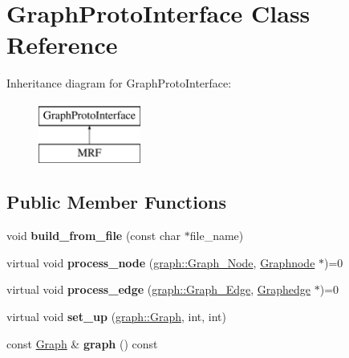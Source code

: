 \hypertarget{classGraphProtoInterface}{
\section{GraphProtoInterface Class Reference}
\label{classGraphProtoInterface}
}
Inheritance diagram for GraphProtoInterface:\begin{figure}[H]
\begin{center}
\leavevmode
\includegraphics[height=2cm]{classGraphProtoInterface}
\end{center}
\end{figure}
\subsection*{Public Member Functions}
\begin{DoxyCompactItemize}
\item 
\hypertarget{classGraphProtoInterface_a4845501ec86ea627ce484cd78162c84c}{
void {\bfseries build\_\-from\_\-file} (const char $\ast$file\_\-name)}
\label{classGraphProtoInterface_a4845501ec86ea627ce484cd78162c84c}

\item 
\hypertarget{classGraphProtoInterface_a0dbd0905dbab167b9293d0ef32409af3}{
virtual void {\bfseries process\_\-node} (\hyperlink{classgraph_1_1Graph__Node}{graph::Graph\_\-Node}, \hyperlink{classScarab_1_1Graph_1_1Graphnode}{Graphnode} $\ast$)=0}
\label{classGraphProtoInterface_a0dbd0905dbab167b9293d0ef32409af3}

\item 
\hypertarget{classGraphProtoInterface_a3178c5f1eff8ed61d2512af8522cc550}{
virtual void {\bfseries process\_\-edge} (\hyperlink{classgraph_1_1Graph__Edge}{graph::Graph\_\-Edge}, \hyperlink{classScarab_1_1Graph_1_1Graphedge}{Graphedge} $\ast$)=0}
\label{classGraphProtoInterface_a3178c5f1eff8ed61d2512af8522cc550}

\item 
\hypertarget{classGraphProtoInterface_a8b3125379c7b2bbf832b6b955496b76e}{
virtual void {\bfseries set\_\-up} (\hyperlink{classgraph_1_1Graph}{graph::Graph}, int, int)}
\label{classGraphProtoInterface_a8b3125379c7b2bbf832b6b955496b76e}

\item 
\hypertarget{classGraphProtoInterface_a920e88785192db805206c875a8a3feed}{
const \hyperlink{classScarab_1_1Graph_1_1Graph}{Graph} \& {\bfseries graph} () const }
\label{classGraphProtoInterface_a920e88785192db805206c875a8a3feed}

\end{DoxyCompactItemize}

